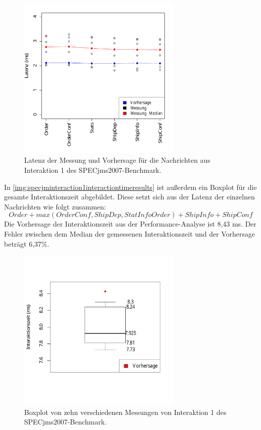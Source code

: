 \begin{figure}
\center
  \includegraphics[width=0.7\textwidth]{images/evaluation/specjmsresults/interaktion1.pdf}
  \caption{Latenz der Messung und Vorhersage für die Nachrichten aus Interaktion 1 des SPECjms2007-Benchmark.}
  \label{img:specjminteraction1results}
\end{figure}

In \autoref{img:specjminteraction1interactiontimeresults} ist außerdem ein Boxplot für die gesamte Interaktionszeit abgebildet. Diese setzt sich aus der Latenz der einzelnen Nachrichten wie folgt zusammen: \[\mathit{Order} + max(\mathit{OrderConf}, \mathit{ShipDep}, \mathit{StatInfoOrder}) + \mathit{ShipInfo} + \mathit{ShipConf}\] 
Die Vorhersage der Interaktionszeit aus der Performance-Analyse ist 8,43 ms. Der Fehler zwischen dem Median der gemessenen Interaktionszeit und der Vorhersage beträgt 6,37\%.

\begin{figure}[t]
\center
  \includegraphics[width=0.7\textwidth]{images/evaluation/specjmsresults/interaktion1InteractionTime.pdf}
  \caption{Boxplot von zehn verschiedenen Messungen von Interaktion 1 des SPECjms2007-Benchmark.}
  \label{img:specjminteraction1interactiontimeresults}
\end{figure}

